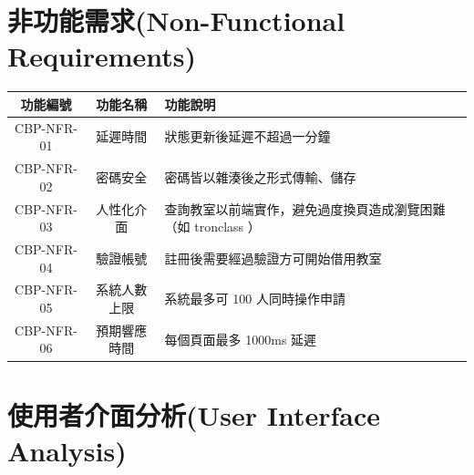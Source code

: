 \documentclass{article}
\begin{document}
\section[非功能需求(NON-FUNCTIONAL REQUIREMENTS)]{非功能需求(Non-Functional Requirements)}
\begin{tabularx}{\textwidth}{|c|c|X|}
	\hline
	功能編號       & 功能名稱   & 功能說明                                 \\ \hline
	CBP-NFR-01 & 延遲時間   & 狀態更新後延遲不超過一分鐘                        \\ \hline
	CBP-NFR-02 & 密碼安全   & 密碼皆以雜湊後之形式傳輸、儲存                      \\ \hline
	CBP-NFR-03 & 人性化介面  & 查詢教室以前端實作，避免過度換頁造成瀏覽困難（如 tronclass ） \\ \hline
	CBP-NFR-04 & 驗證帳號   & 註冊後需要經過驗證方可開始借用教室                    \\ \hline
	CBP-NFR-05 & 系統人數上限 & 系統最多可 100 人同時操作申請                    \\ \hline
	CBP-NFR-06 & 預期響應時間 & 每個頁面最多 1000ms 延遲                     \\ \hline
\end{tabularx}
\newpage

\section[使用者介面分析(USER INTERFACE ANALYSIS)]{使用者介面分析(User Interface Analysis)}
\end{document}
